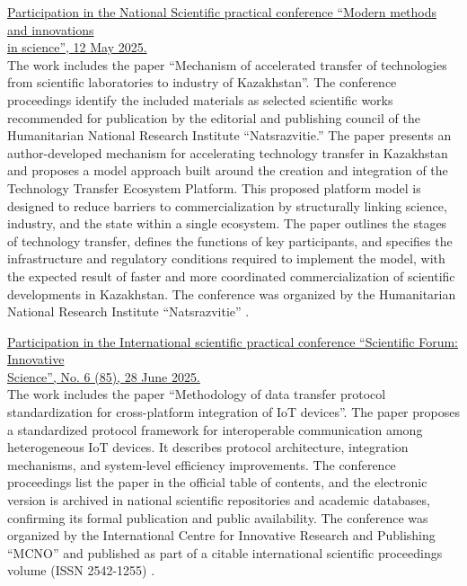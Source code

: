 \bigskip

\noindent\underline{Participation in the National Scientific practical conference ``Modern methods and innovations} \\
\noindent\underline{in science'', 12 May 2025.} \\
The work includes the paper ``Mechanism of accelerated transfer of technologies from scientific laboratories to industry of Kazakhstan''. The conference proceedings identify the included materials as selected scientific works recommended for publication by the editorial and publishing council of the Humanitarian National Research Institute ``Natsrazvitie.'' The paper presents an author-developed mechanism for accelerating technology transfer in Kazakhstan and proposes a model approach built around the creation and integration of the Technology Transfer Ecosystem Platform. This proposed platform model is designed to reduce barriers to commercialization by structurally linking science, industry, and the state within a single ecosystem. The paper outlines the stages of technology transfer, defines the functions of key participants, and specifies the infrastructure and regulatory conditions required to implement the model, with the expected result of faster and more coordinated commercialization of scientific developments in Kazakhstan. The conference was organized by the Humanitarian National Research Institute ``Natsrazvitie'' .

\bigskip

\noindent\underline{Participation in the International scientific practical conference ``Scientific Forum: Innovative} \\
\noindent\underline{Science'', No. 6 (85), 28 June 2025.} \\
The work includes the paper ``Methodology of data transfer protocol standardization for cross-platform integration of IoT devices''. The paper proposes a standardized protocol framework for interoperable communication among heterogeneous IoT devices. It describes protocol architecture, integration mechanisms, and system-level efficiency improvements. The conference proceedings list the paper in the official table of contents, and the electronic version is archived in national scientific repositories and academic databases, confirming its formal publication and public availability. The conference was organized by the International Centre for Innovative Research and Publishing ``MCNO'' and published as part of a citable international scientific proceedings volume (ISSN 2542-1255) .

